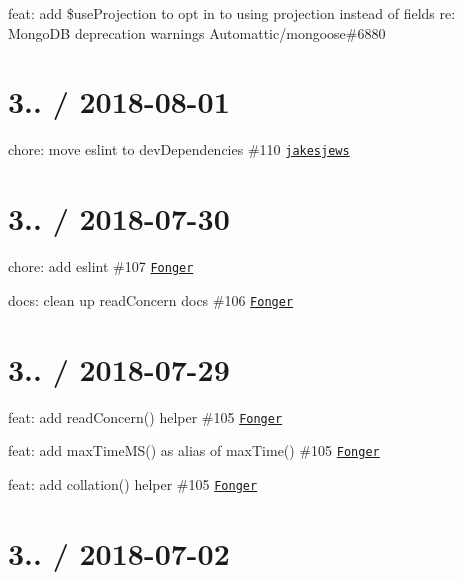 
\begin{DoxyItemize}
\item feat\+: add \$use\+Projection to opt in to using {\ttfamily projection} instead of {\ttfamily fields} re\+: Mongo\+DB deprecation warnings Automattic/mongoose\#6880
\end{DoxyItemize}

\section*{3.. / 2018-\/08-\/01 }


\begin{DoxyItemize}
\item chore\+: move eslint to dev\+Dependencies \#110 \href{https://github.com/jakesjews}{\tt jakesjews}
\end{DoxyItemize}

\section*{3.. / 2018-\/07-\/30 }


\begin{DoxyItemize}
\item chore\+: add eslint \#107 \href{https://github.com/Fonger}{\tt Fonger}
\item docs\+: clean up read\+Concern docs \#106 \href{https://github.com/Fonger}{\tt Fonger}
\end{DoxyItemize}

\section*{3.. / 2018-\/07-\/29 }


\begin{DoxyItemize}
\item feat\+: add {\ttfamily read\+Concern()} helper \#105 \href{https://github.com/Fonger}{\tt Fonger}
\item feat\+: add {\ttfamily max\+Time\+M\+S()} as alias of {\ttfamily max\+Time()} \#105 \href{https://github.com/Fonger}{\tt Fonger}
\item feat\+: add {\ttfamily collation()} helper \#105 \href{https://github.com/Fonger}{\tt Fonger}
\end{DoxyItemize}

\section*{3.. / 2018-\/07-\/02 }


